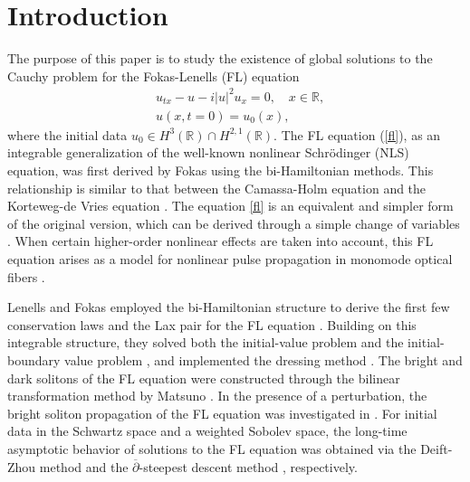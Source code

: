 \documentclass[preprint,compress,12pt]{elsarticle}
\numberwithin{equation}{section}
\begin{document}
\section{Introduction}
The purpose of this paper is to study the existence of global solutions to the Cauchy problem for the Fokas-Lenells (FL) equation
\begin{align}
&u_{tx}-u-i|u|^{2}u_{x}=0,\quad x\in\mathbb{R},\label{fl}\\
&u(x,t=0)=u_{0}(x),\label{initial}
\end{align}
where the initial data $u_{0}\in H^{3}(\mathbb{R})\cap H^{2,1}(\mathbb{R})$.
  The FL equation (\ref{fl}), as  an integrable generalization of the well-known  nonlinear Schr\"{o}dinger (NLS) equation,   was first  derived by Fokas \cite{Fokas} using the bi-Hamiltonian methods. This relationship is similar to that between the Camassa-Holm equation and the Korteweg-de Vries equation \cite{ch}. The  equation \eqref{fl} is an equivalent and simpler form of the original version, which can be derived through a simple change of variables \cite{Lenells}. When certain higher-order nonlinear effects are taken into account, this FL equation arises as a model for nonlinear pulse propagation in monomode optical fibers \cite{Lenells}.

Lenells and Fokas employed the bi-Hamiltonian structure to derive the first few conservation laws and the Lax pair for the FL equation \cite{FL}. Building on this integrable structure, they solved both the initial-value problem \cite{FL} and the initial-boundary value problem \cite{FLibvp}, and implemented the dressing method \cite{FLdr}. The bright and dark solitons of the FL equation were constructed through the bilinear transformation method by Matsuno \cite{bright,dark}. In the presence of a perturbation, the bright soliton propagation of the FL equation was investigated in \cite{pertu}. For initial data in the Schwartz space and a weighted Sobolev space, the long-time asymptotic behavior of solutions to the FL equation was obtained via the Deift-Zhou method \cite{xuj} and the $\overline{\partial}$-steepest descent method \cite{Chengasy}, respectively.
\end{document}
